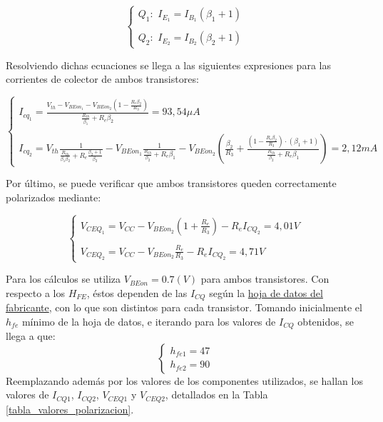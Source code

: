 	\begin{equation}
		\begin{cases}
		Q_{1}: \, \, I_{E_{1}} = I_{B_{1}}(\beta_{1}+1)\\ \\
		Q_{2}: \, \, I_{E_{2}}=I_{B_{2}}(\beta_{2}+1)
		\end{cases}
	\end{equation}

Resolviendo dichas ecuaciones se llega a las siguientes expresiones para las corrientes de colector de ambos transistores:

	\begin{equation}
		\begin{cases}
		I_{cq_{1}}=\frac{V_{th}-V_{BEon_{1}}-V_{BEon_{2}}\left(1-\frac{R_{e}\beta_{2}}{R_{3}}\right)}{\frac{R_{th}}{\beta_{1}}+R_{e}\beta_{2}} = 93,54\mu A\\ \\
		I_{cq_{2}}=V_{th}\frac{1}{\frac{R_{th}}{\beta_{1}\beta_{2}}+R_{e}\frac{\beta_{2}+1}{\beta_{2}}}-V_{BEon_{1}}\frac{1}{\frac{R_{th}}{\beta_{2}}+R_{e}\beta_{1}}-V_{BEon_{2}}\left(\frac{\beta_{2}}{R_{3}}+\frac{\left(1-\frac{R_{e}\beta_{2}}{R_{3}}\right)\cdot(\beta_{1}+1)}{\frac{R_{th}}{\beta_{2}}+R_{e}\beta_{1}} \right) = 2,12mA
		\end{cases}
	\end{equation}

Por último, se puede verificar que ambos transistores queden correctamente polarizados mediante:

	\begin{equation}
		\begin{cases}
		V_{CEQ_{1}}=V_{CC}-V_{BEon_{2}}\left(1+\frac{R_{e}}{R_{3}}\right)-R_{e}I_{CQ_{2}} = 4,01V\\ \\
		V_{CEQ_{2}}=V_{CC}-V_{BEon_{2}}\frac{R_{e}}{R_{3}}-R_{e}I_{CQ_{2}} = 4,71V
		\end{cases}
	\end{equation}
	

Para los cálculos se utiliza $V_{BEon}=0.7(V)$ para ambos transistores. Con respecto a los $H_{FE}$, éstos dependen de las $I_{CQ}$ según la \href{https://pdf1.alldatasheet.com/datasheet-pdf/view/171970/ONSEMI/BC337-40.html}{hoja de datos del fabricante}, con lo que son distintos para cada transistor. Tomando inicialmente el $h_{fe}$ mínimo de la hoja de datos, e iterando para los valores de $I_{CQ}$ obtenidos, se llega a que:
	\begin{equation*}
		\begin{cases}
		 h_{fe1} = 47\\
		 h_{fe2} = 90
		\end{cases}
	\end{equation*}
Reemplazando además por los valores de los componentes utilizados, se hallan los valores de $I_{CQ1}$, $I_{CQ2}$, $V_{CEQ1}$ y $V_{CEQ2}$, detallados en la Tabla \ref{tabla_valores_polarizacion}.

